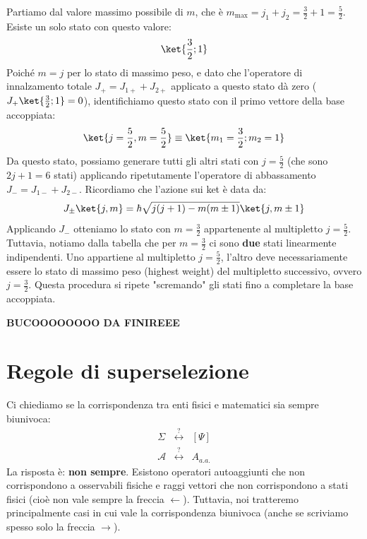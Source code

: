Partiamo dal valore massimo possibile di $m$, che è $m_{\text{max}} = j_1 + j_2 = \frac{3}{2} + 1 = \frac{5}{2}$.
Esiste un solo stato con questo valore:
\[
    \ket{\frac{3}{2}; 1}
\]
Poiché $m=j$ per lo stato di massimo peso, e dato che l'operatore di innalzamento totale $J_+ = J_{1+} + J_{2+}$ applicato a questo stato dà zero ($J_+ \ket{\frac{3}{2}; 1} = 0$), identifichiamo questo stato con il primo vettore della base accoppiata:
\[
    \ket{j=\frac{5}{2}, m=\frac{5}{2}} \equiv \ket{m_1=\frac{3}{2}; m_2=1}
\]
Da questo stato, possiamo generare tutti gli altri stati con $j=\frac{5}{2}$ (che sono $2j+1 = 6$ stati) applicando ripetutamente l'operatore di abbassamento $J_- = J_{1-} + J_{2-}$. Ricordiamo che l'azione sui ket è data da:
\[
    J_{\pm}\ket{j,m} = \hbar\sqrt{j(j+1) - m(m\pm 1)}\ket{j, m\pm 1}
\]
Applicando $J_-$ otteniamo lo stato con $m=\frac{3}{2}$ appartenente al multipletto $j=\frac{5}{2}$.
Tuttavia, notiamo dalla tabella che per $m=\frac{3}{2}$ ci sono \textbf{due} stati linearmente indipendenti. Uno appartiene al multipletto $j=\frac{5}{2}$, l'altro deve necessariamente essere lo stato di massimo peso (highest weight) del multipletto successivo, ovvero $j=\frac{3}{2}$.
Questa procedura si ripete "scremando" gli stati fino a completare la base accoppiata.


\textbf{BUCOOOOOOOO DA FINIREEE}




\section{Regole di superselezione}

Ci chiediamo se la corrispondenza tra enti fisici e matematici sia sempre biunivoca:
\[
    \begin{matrix}
        \Sigma & \overset{?}{\longleftrightarrow} & [\Psi] \\
        \mathcal{A} & \overset{?}{\longleftrightarrow} & A_{a.a.}
    \end{matrix}
\]
La risposta è: \textbf{non sempre}.
Esistono operatori autoaggiunti che non corrispondono a osservabili fisiche e raggi vettori che non corrispondono a stati fisici (cioè non vale sempre la freccia $\leftarrow$).
Tuttavia, noi tratteremo principalmente casi in cui vale la corrispondenza biunivoca (anche se scriviamo spesso solo la freccia $\to$).


